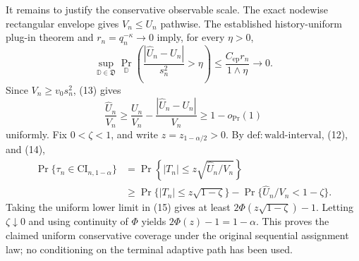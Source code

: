 It remains to justify the conservative observable scale.  The exact
nodewise rectangular envelope gives \(V_n\le U_n\) pathwise.  The established
history-uniform plug-in theorem and \(r_n=q_n^{-\kappa}\to0\) imply, for every
\(\eta>0\),
\[
\sup_{\mathbb D\in\mathfrak D}
\Pr_{\mathbb D}\!\left(
\frac{|\widehat U_n-U_n|}{s_n^2}>\eta\right)
\le\frac{C_{\mathrm{ep}}r_n}{1\wedge\eta}\longrightarrow0.
\tag{13}
\]
Since \(V_n\ge v_0s_n^2\), (13) gives
\[
\frac{\widehat U_n}{V_n}
\ge\frac{U_n}{V_n}-\frac{|\widehat U_n-U_n|}{V_n}
\ge1-o_{\Pr}(1)
\tag{14}
\]
uniformly.  Fix \(0<\zeta<1\), and write
\(z=z_{1-\alpha/2}>0\).  By
\(\mathrm{def:wald\text{-}interval}\), (12), and (14),
\[
\begin{aligned}
\Pr\{\tau_n\in\mathrm{CI}_{n,1-\alpha}\}
&=\Pr\!\left\{|T_n|\le z\sqrt{\widehat U_n/V_n}\right\}\\
&\ge\Pr\{|T_n|\le z\sqrt{1-\zeta}\}
-\Pr\{\widehat U_n/V_n<1-\zeta\}.
\end{aligned}
\tag{15}
\]
Taking the uniform lower limit in (15) gives at least
\(2\Phi(z\sqrt{1-\zeta})-1\).  Letting \(\zeta\downarrow0\) and using
continuity of \(\Phi\) yields \(2\Phi(z)-1=1-\alpha\).  This proves the
claimed uniform conservative coverage under the original sequential
assignment law; no conditioning on the terminal adaptive path has been
used.